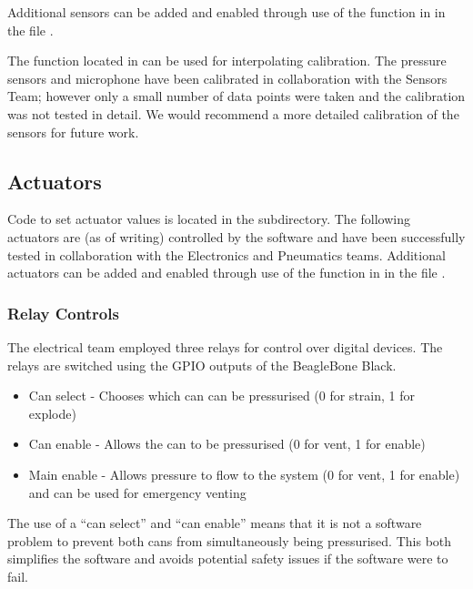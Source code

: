 Additional sensors can be added and enabled through use of the  function in  in the file .

The function  located in  can be used for interpolating calibration. The pressure sensors and microphone have been calibrated in collaboration with the Sensors Team; however only a small number of data points were taken and the calibration was not tested in detail. We would recommend a more detailed calibration of the sensors for future work.

\subsection{Actuators}

Code to set actuator values is located in the  subdirectory. The following actuators are (as of writing) controlled by the software and have been successfully tested in collaboration with the Electronics and Pneumatics teams. Additional actuators can be added and enabled through use of the  function in  in the file .

\subsubsection{Relay Controls} 

The electrical team employed three relays for control over digital devices. The relays are switched using the GPIO outputs of the BeagleBone Black.

\begin{itemize}
	\item Can select - Chooses which can can be pressurised (0 for strain, 1 for explode)
	\item Can enable - Allows the can to be pressurised (0 for vent, 1 for enable)
	\item Main enable - Allows pressure to flow to the system (0 for vent, 1 for enable) and can be used for emergency venting
\end{itemize}

The use of a ``can select'' and ``can enable'' means that it is not a software problem to prevent both cans from simultaneously being pressurised. This both simplifies the software and avoids potential safety issues if the software were to fail.


